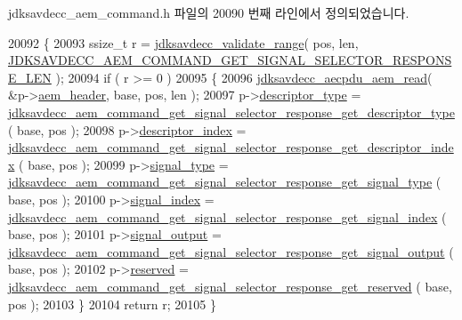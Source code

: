 jdksavdecc\+\_\+aem\+\_\+command.\+h 파일의 20090 번째 라인에서 정의되었습니다.


\begin{DoxyCode}
20092 \{
20093     ssize\_t r = \hyperlink{group__util_ga9c02bdfe76c69163647c3196db7a73a1}{jdksavdecc\_validate\_range}( pos, len, 
      \hyperlink{group__command__get__signal__selector__response_ga4a41341e46b170f9678cd06cde61f1c9}{JDKSAVDECC\_AEM\_COMMAND\_GET\_SIGNAL\_SELECTOR\_RESPONSE\_LEN}
       );
20094     \textcolor{keywordflow}{if} ( r >= 0 )
20095     \{
20096         \hyperlink{group__aecpdu__aem_gae2421015dcdce745b4f03832e12b4fb6}{jdksavdecc\_aecpdu\_aem\_read}( &p->\hyperlink{structjdksavdecc__aem__command__get__signal__selector__response_ae1e77ccb75ff5021ad923221eab38294}{aem\_header}, base, pos, len );
20097         p->\hyperlink{structjdksavdecc__aem__command__get__signal__selector__response_ab7c32b6c7131c13d4ea3b7ee2f09b78d}{descriptor\_type} = 
      \hyperlink{group__command__get__signal__selector__response_ga7901e5fd86199424ef292086f7e7d44d}{jdksavdecc\_aem\_command\_get\_signal\_selector\_response\_get\_descriptor\_type}
      ( base, pos );
20098         p->\hyperlink{structjdksavdecc__aem__command__get__signal__selector__response_a042bbc76d835b82d27c1932431ee38d4}{descriptor\_index} = 
      \hyperlink{group__command__get__signal__selector__response_gaeda1f10c684fb4899ed11ea05b93626c}{jdksavdecc\_aem\_command\_get\_signal\_selector\_response\_get\_descriptor\_index}
      ( base, pos );
20099         p->\hyperlink{structjdksavdecc__aem__command__get__signal__selector__response_a248e60ef99d5ed1779989d1dd6b6dc5a}{signal\_type} = 
      \hyperlink{group__command__get__signal__selector__response_gab22cb037fbb295d3582885e4df0d9d9d}{jdksavdecc\_aem\_command\_get\_signal\_selector\_response\_get\_signal\_type}
      ( base, pos );
20100         p->\hyperlink{structjdksavdecc__aem__command__get__signal__selector__response_ae2e81a95ee9ad83f1fe22b6a1ee29075}{signal\_index} = 
      \hyperlink{group__command__get__signal__selector__response_ga249d162fe0b4e8ca2e11d50d8c0e81c7}{jdksavdecc\_aem\_command\_get\_signal\_selector\_response\_get\_signal\_index}
      ( base, pos );
20101         p->\hyperlink{structjdksavdecc__aem__command__get__signal__selector__response_ab4b91864e6fc335d7e86536d9f4461e4}{signal\_output} = 
      \hyperlink{group__command__get__signal__selector__response_ga3960c6b55f6717c0cf314a97ee33c685}{jdksavdecc\_aem\_command\_get\_signal\_selector\_response\_get\_signal\_output}
      ( base, pos );
20102         p->\hyperlink{structjdksavdecc__aem__command__get__signal__selector__response_a5a6ed8c04a3db86066924b1a1bf4dad3}{reserved} = 
      \hyperlink{group__command__get__signal__selector__response_ga7bafec92fc051d41443e8add99753670}{jdksavdecc\_aem\_command\_get\_signal\_selector\_response\_get\_reserved}
      ( base, pos );
20103     \}
20104     \textcolor{keywordflow}{return} r;
20105 \}
\end{DoxyCode}


